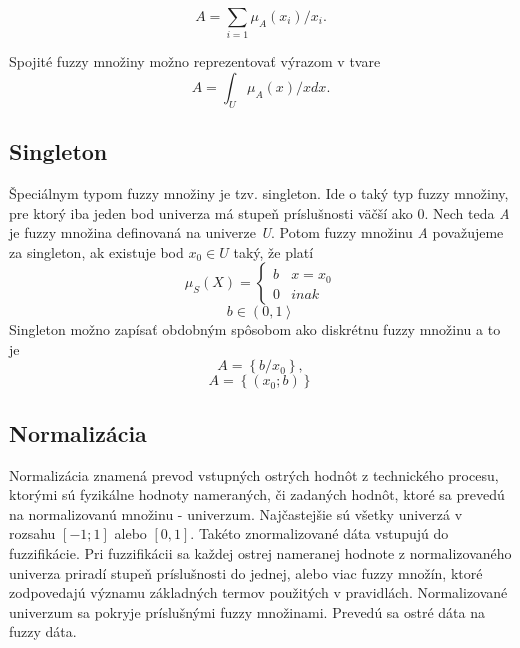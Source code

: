\begin{equation}\label{disk3}
A = 
\sum\limits_{i=1} \mu_A(x_i)/x_i . 
\end{equation}

Spojité fuzzy množiny možno reprezentovať výrazom v tvare \cite{gregorref1}
\begin{equation}\label{disk4}
A = \int_{U}^{}  \mu_A(x)/xdx . 
\end{equation}

\subsection*{Singleton}
Špeciálnym typom fuzzy množiny je tzv. singleton. Ide o taký typ fuzzy množiny, pre ktorý iba jeden bod univerza má stupeň príslušnosti väčší ako 0. 
Nech teda\textit{ A }je fuzzy množina definovaná na univerze \textit{U}. Potom fuzzy množinu \textit{A} považujeme za singleton, ak existuje bod $x_0 \in U$ taký, že platí \cite{gregorUI} 
\begin{equation}\label{singleton0}
\mu_S (X) = 
\begin{cases}
b &  x = x_0 \\
0 &  inak
\end{cases}
\end{equation}
 $$ b \in \left(  0, 1 \right\rangle $$
Singleton možno zapísať obdobným spôsobom ako diskrétnu fuzzy množinu a to je \cite{gregorUI} 
\begin{equation}\label{singleton1}
A = \left\lbrace b/x_0 \right\rbrace , 
\end{equation}
\begin{equation}\label{singleton2}
A = \left\lbrace \left( x_0 ; b \right) \right\rbrace 
\end{equation}

\subsection*{Normalizácia }

Normalizácia znamená prevod vstupných ostrých hodnôt z technického procesu, ktorými sú fyzikálne hodnoty  nameraných, či zadaných hodnôt, ktoré sa prevedú na normalizovanú množinu - univerzum. Najčastejšie sú všetky univerzá v rozsahu $[-1;1]$ alebo $[0, 1]$. Takéto znormalizované dáta vstupujú do fuzzifikácie. Pri fuzzifikácii sa každej ostrej nameranej hodnote z normalizovaného univerza priradí stupeň príslušnosti do jednej, alebo viac fuzzy množín, ktoré zodpovedajú významu základných termov použitých v pravidlách. Normalizované univerzum sa pokryje príslušnými fuzzy množinami. Prevedú sa ostré dáta na fuzzy dáta. \cite{sedlakova}

